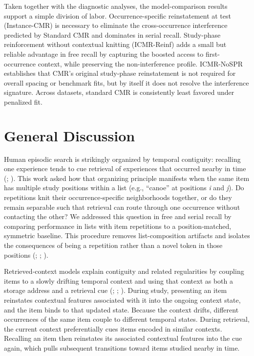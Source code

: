 \documentclass[
  man,
  floatsintext,
  longtable,
  nolmodern,
  notxfonts,
  notimes,
  draftfirst,
  colorlinks=true,linkcolor=blue,citecolor=blue,urlcolor=blue]{apa7}
\begin{document}
Taken together with the diagnostic analyses, the model-comparison
results support a simple division of labor. Occurrence-specific
reinstatement at test (Instance-CMR) is necessary to eliminate the
cross-occurrence interference predicted by Standard CMR and dominates in
serial recall. Study-phase reinforcement without contextual knitting
(ICMR-Reinf) adds a small but reliable advantage in free recall by
capturing the boosted access to first-occurrence context, while
preserving the non-interference profile. ICMR-NoSPR establishes that
CMR's original study-phase reinstatement is not required for overall
spacing or benchmark fits, but by itself it does not resolve the
interference signature. Across datasets, standard CMR is consistently
least favored under penalized fit.

\section{General Discussion}\label{general-discussion}

Human episodic search is strikingly organized by temporal contiguity:
recalling one experience tends to cue retrieval of experiences that
occurred nearby in time (; ). This
work asked how that organizing principle manifests when the same item
has multiple study positions within a list (e.g., ``canoe'' at positions
\emph{i} and \emph{j}). Do repetitions knit their occurrence‑specific
neighborhoods together, or do they remain separable such that retrieval
can route through one occurrence without contacting the other? We
addressed this question in free and serial recall by comparing
performance in lists with item repetitions to a position‑matched,
symmetric baseline. This procedure removes list-composition artifacts
and isolates the consequences of being a repetition rather than a novel
token in those positions (; ;
).

Retrieved‑context models explain contiguity and related regularities by
coupling items to a slowly drifting temporal context and using that
context as both a storage address and a retrieval cue
(;
;
). During study,
presenting an item reinstates contextual features associated with it
into the ongoing context state, and the item binds to that updated
state. Because the context drifts, different occurrences of the same
item couple to different temporal states. During retrieval, the current
context preferentially cues items encoded in similar contexts. Recalling
an item then reinstates its associated contextual features into the cue
again, which pulls subsequent transitions toward items studied nearby in
time.
\end{document}

